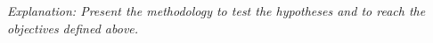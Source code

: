 % 
% 

\emph{Explanation: Present the methodology to test the hypotheses and to reach
the objectives defined above.} 





% 
